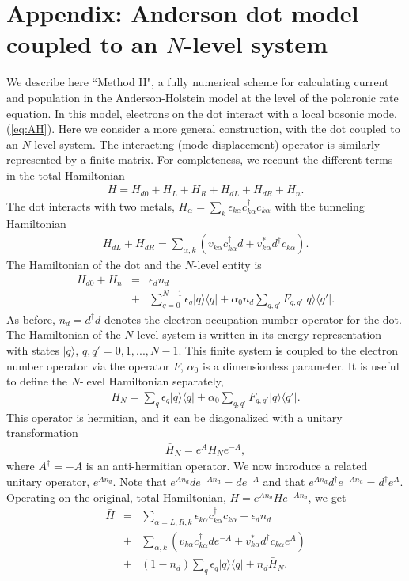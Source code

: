 \documentclass[aps,pra,twocolumn,groupedaddress,showpacs,superscriptaddress,amssymb,amsmath]{revtex4-1}
\newcommand{\bea}{\begin{eqnarray}}
\newcommand{\eea}{\end{eqnarray}}
\begin{document}
\renewcommand{\theequation}{A\arabic{equation}}
\setcounter{equation}{0}  %

\section*{Appendix: Anderson dot model coupled to an $N$-level system}

We describe here ``Method II", a fully numerical scheme for calculating current and population in the 
Anderson-Holstein model at the level of the polaronic rate equation.
%
In this model, electrons on the dot interact with a local bosonic mode, (\ref{eq:AH}).
Here we consider a more general construction, with the dot coupled to an $N$-level system. The interacting (mode 
displacement) operator is similarly represented by a finite matrix.
%
For completeness, we recount the different terms in the total Hamiltonian
%
\bea
H= H_{d0}+ H_L+H_R + H_{dL}+H_{dR}+ H_n.
\eea
%
The dot interacts with two metals,
$H_{\alpha} =\sum_{k}\epsilon_{k\alpha} c_{k\alpha}^{\dagger}c_{k\alpha}$
with the tunneling Hamiltonian
%
\bea
H_{dL}+H_{dR}=\sum_{\alpha,k}\left(v_{k\alpha}c_{k\alpha}^{\dagger}d 
+v_{k\alpha}^*d^{\dagger}c_{k\alpha}\right).
\label{eq:Apphyb}
\eea
%
The Hamiltonian of the dot and the $N$-level entity is
%
\bea
H_{d0}+H_n&=& \epsilon_d n_d 
\nonumber\\
&+&
\sum_{q=0}^{N-1}\epsilon_q |q\rangle \langle q| + \alpha_0 n_d \sum_{q,q'}F_{q,q'}|q\rangle \langle q'|.
\eea
%
As before, $n_d=d^{\dagger}d$ denotes the electron occupation number operator for the dot.
The Hamiltonian of the $N$-level system is written in its energy representation
with states $|q\rangle$, $q,q'=0,1,...,N-1$.
This finite system is coupled to the electron number operator via the operator $F$,
$\alpha_0$ is a dimensionless parameter.
%
It is useful to define the $N$-level Hamiltonian separately, 
%
\bea
H_{N}=\sum_q\epsilon_q|q\rangle \langle q|
+\alpha_0\sum_{q,q'}F_{q,q'}|q\rangle\langle q'|.
\label{eq:Himp}
\eea
%
This operator is hermitian, and it can be diagonalized with a unitary transformation
%
\bea
\bar H_{N}= e^AH_{N} e^{-A},
\label{eq:U}
\eea
%
where $A^{\dagger}=-A$ is an anti-hermitian operator.
We now introduce a related unitary operator, $e^{A n_d}$. Note that
$e^{A n_d}de^{-A n_d}=de^{-A}$ and that $e^{A n_d}d^{\dagger}e^{-A n_d}=d^{\dagger}e^{A}$.
Operating on the original, total Hamiltonian, $\bar H=e^{A n_d}He^{-A n_d}$, we get
%
\bea
\bar H&=&\sum_{\alpha=L,R,k}\epsilon_{k\alpha}c_{k\alpha}^{\dagger}c_{k\alpha} + \epsilon_d  n_d
\nonumber\\
&+&
\sum_{\alpha,k}\left(v_{k\alpha}c_{k\alpha}^{\dagger}de^{-A} +v_{k\alpha}^*d^{\dagger}c_{k\alpha}e^{A}\right)
\nonumber\\
&+& (1- n_d)\sum_q\epsilon_{q}|q\rangle\langle q| + n_d \bar H_{N}.
\label{eq:barH}
\eea
%
\end{document}
